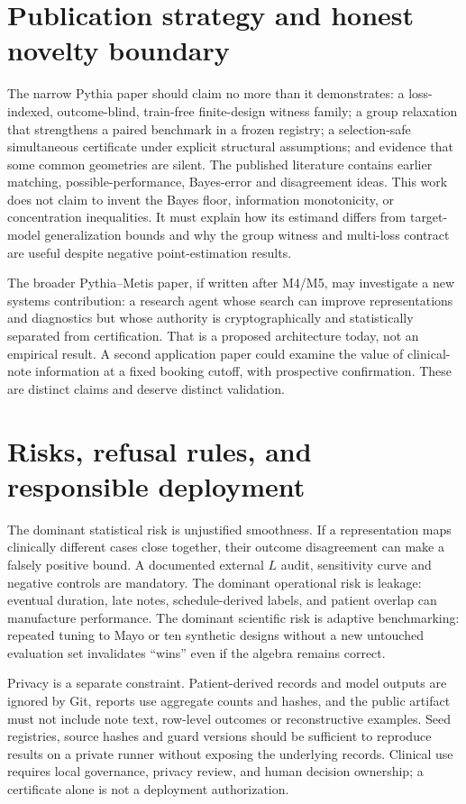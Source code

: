 \documentclass[11pt]{article}
\begin{document}
\section{Publication strategy and honest novelty boundary}
The narrow Pythia paper should claim no more than it demonstrates: a loss-indexed, outcome-blind, train-free finite-design witness family; a group relaxation that strengthens a paired benchmark in a frozen registry; a selection-safe simultaneous certificate under explicit structural assumptions; and evidence that some common geometries are silent. The published literature contains earlier matching, possible-performance, Bayes-error and disagreement ideas. This work does not claim to invent the Bayes floor, information monotonicity, or concentration inequalities. It must explain how its estimand differs from target-model generalization bounds and why the group witness and multi-loss contract are useful despite negative point-estimation results.

The broader Pythia--Metis paper, if written after M4/M5, may investigate a new systems contribution: a research agent whose search can improve representations and diagnostics but whose authority is cryptographically and statistically separated from certification. That is a proposed architecture today, not an empirical result. A second application paper could examine the value of clinical-note information at a fixed booking cutoff, with prospective confirmation. These are distinct claims and deserve distinct validation.

\section{Risks, refusal rules, and responsible deployment}
The dominant statistical risk is unjustified smoothness. If a representation maps clinically different cases close together, their outcome disagreement can make a falsely positive bound. A documented external $L$ audit, sensitivity curve and negative controls are mandatory. The dominant operational risk is leakage: eventual duration, late notes, schedule-derived labels, and patient overlap can manufacture performance. The dominant scientific risk is adaptive benchmarking: repeated tuning to Mayo or ten synthetic designs without a new untouched evaluation set invalidates ``wins'' even if the algebra remains correct.

Privacy is a separate constraint. Patient-derived records and model outputs are ignored by Git, reports use aggregate counts and hashes, and the public artifact must not include note text, row-level outcomes or reconstructive examples. Seed registries, source hashes and guard versions should be sufficient to reproduce results on a private runner without exposing the underlying records. Clinical use requires local governance, privacy review, and human decision ownership; a certificate alone is not a deployment authorization.
\end{document}
